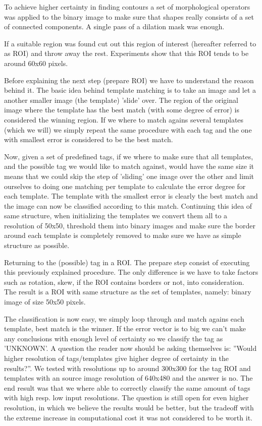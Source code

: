 To achieve higher certainty in finding contours a set of morphological operators was applied to the binary image to make sure that shapes really consists of a set of connected components. A single pass of a dilation mask was enough.

If a suitable region was found cut out this region of interest (hereafter referred to as ROI) and throw away the rest. Experiments show that this ROI tends to be around 60x60 pixels. 

Before explaining the next step (prepare ROI) we have to understand the reason behind it. The basic idea behind template matching is to take an image and let a another smaller image (the template) 'slide' over. The region of the original image where the template has the best match (with some degree of error) is considered the winning region. If we where to match agains several templates (which we will) we simply repeat the same procedure with each tag and the one with smallest error is considered to be the best match.

Now, given a set of predefined tags, if we where to make sure that all templates, and the possible tag we would like to match against, would have the same size it means that we could skip the step of 'sliding' one image over the other and limit ourselves to doing one matching per template to calculate the error degree for each template. The template with the smallest error is clearly the best match and the image can now be classified according to this match. Continuing this idea of same structure, when initializing the templates we convert them all to a resolution of 50x50, threshold them into binary images and make sure the border around each template is completely removed to make sure we have as simple structure as possible.

Returning to the (possible) tag in a ROI. The prepare step consist of executing this previously explained procedure. The only difference is we have to take factors such as rotation, skew, if the ROI contains borders or not, into consideration. The result is a ROI with same structure as the set of templates, namely: binary image of size 50x50 pixels.

The classification is now easy, we simply loop through and match agains each template, best match is the winner. If the error vector is to big we can't make any conclusions with enough level of certainty so we classify the tag as 'UNKNOWN'. A question the reader now should be asking themselves is: ''Would higher resolution of tags/templates give higher degree of certainty in the results?''. We tested with resolutions up to around 300x300 for the tag ROI and templates with an source image resolution of 640x480 and the answer is no. The end result was that we where able to correctly classify the same amount of tags with high resp. low input resolutions. The question is still open for even higher resolution, in which we believe the results would be better, but the tradeoff with the extreme increase in computational cost it was not considered to be worth it.

